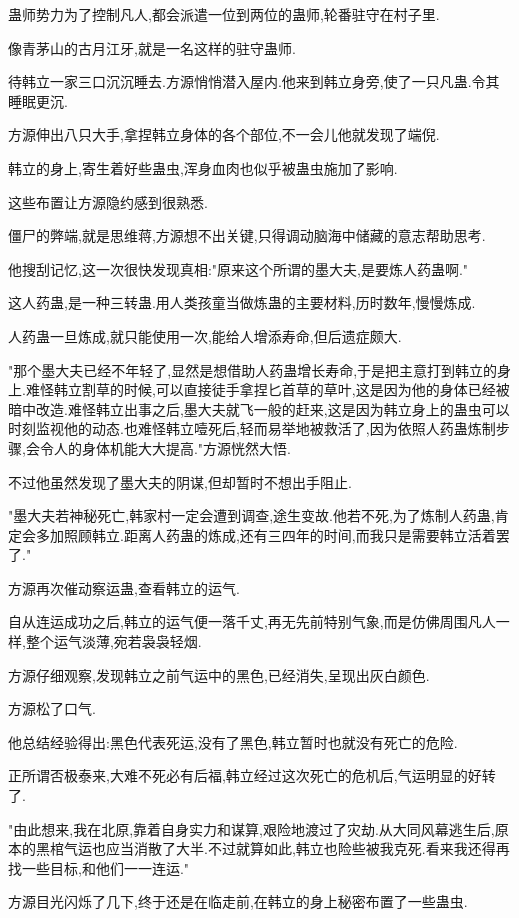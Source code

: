 \begin{this_body}
蛊师势力为了控制凡人,都会派遣一位到两位的蛊师,轮番驻守在村子里.

像青茅山的古月江牙,就是一名这样的驻守蛊师.

待韩立一家三口沉沉睡去.方源悄悄潜入屋内.他来到韩立身旁,使了一只凡蛊.令其睡眠更沉.

方源伸出八只大手,拿捏韩立身体的各个部位,不一会儿他就发现了端倪.

韩立的身上,寄生着好些蛊虫,浑身血肉也似乎被蛊虫施加了影响.

这些布置让方源隐约感到很熟悉.

僵尸的弊端,就是思维蒋,方源想不出关键,只得调动脑海中储藏的意志帮助思考.

他搜刮记忆,这一次很快发现真相:"原来这个所谓的墨大夫,是要炼人药蛊啊."

这人药蛊,是一种三转蛊.用人类孩童当做炼蛊的主要材料,历时数年,慢慢炼成.

人药蛊一旦炼成,就只能使用一次,能给人增添寿命,但后遗症颇大.

"那个墨大夫已经不年轻了,显然是想借助人药蛊增长寿命,于是把主意打到韩立的身上.难怪韩立割草的时候,可以直接徒手拿捏匕首草的草叶,这是因为他的身体已经被暗中改造.难怪韩立出事之后,墨大夫就飞一般的赶来,这是因为韩立身上的蛊虫可以时刻监视他的动态.也难怪韩立噎死后,轻而易举地被救活了,因为依照人药蛊炼制步骤,会令人的身体机能大大提高."方源恍然大悟.

不过他虽然发现了墨大夫的阴谋,但却暂时不想出手阻止.

"墨大夫若神秘死亡,韩家村一定会遭到调查,途生变故.他若不死,为了炼制人药蛊,肯定会多加照顾韩立.距离人药蛊的炼成,还有三四年的时间,而我只是需要韩立活着罢了."

方源再次催动察运蛊,查看韩立的运气.

自从连运成功之后,韩立的运气便一落千丈,再无先前特别气象,而是仿佛周围凡人一样,整个运气淡薄,宛若袅袅轻烟.

方源仔细观察,发现韩立之前气运中的黑色,已经消失,呈现出灰白颜色.

方源松了口气.

他总结经验得出:黑色代表死运,没有了黑色,韩立暂时也就没有死亡的危险.

正所谓否极泰来,大难不死必有后福,韩立经过这次死亡的危机后,气运明显的好转了.

"由此想来,我在北原,靠着自身实力和谋算,艰险地渡过了灾劫.从大同风幕逃生后,原本的黑棺气运也应当消散了大半.不过就算如此,韩立也险些被我克死.看来我还得再找一些目标,和他们一一连运."

方源目光闪烁了几下,终于还是在临走前,在韩立的身上秘密布置了一些蛊虫.


\end{this_body}

